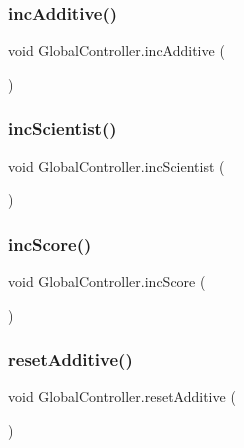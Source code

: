 \subsubsection{\texorpdfstring{inc\+Additive()}{incAdditive()}}
{\footnotesize\ttfamily void Global\+Controller.\+inc\+Additive (\begin{DoxyParamCaption}{ }\end{DoxyParamCaption})}

\mbox{\label{class_global_controller_a84e2d66e0c6c9baa79963554f6f3b2bd}} 
\subsubsection{\texorpdfstring{inc\+Scientist()}{incScientist()}}
{\footnotesize\ttfamily void Global\+Controller.\+inc\+Scientist (\begin{DoxyParamCaption}{ }\end{DoxyParamCaption})}

\mbox{\label{class_global_controller_afe90e502d26e3585ef975555464bc323}} 
\subsubsection{\texorpdfstring{inc\+Score()}{incScore()}}
{\footnotesize\ttfamily void Global\+Controller.\+inc\+Score (\begin{DoxyParamCaption}{ }\end{DoxyParamCaption})}

\mbox{\label{class_global_controller_a5a65bdfd453a4b0f3a609d02872a2f73}} 
\subsubsection{\texorpdfstring{reset\+Additive()}{resetAdditive()}}
{\footnotesize\ttfamily void Global\+Controller.\+reset\+Additive (\begin{DoxyParamCaption}{ }\end{DoxyParamCaption})}

